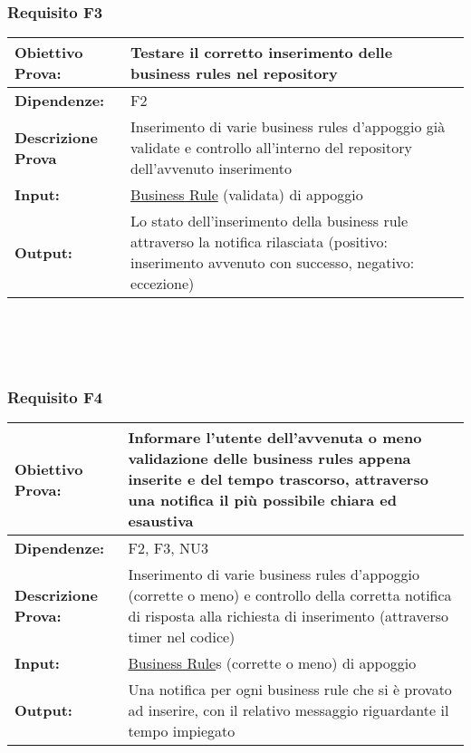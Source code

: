 \subsubsection{Requisito F3}
\begin{tabular}{||p{4cm}||p{8cm}||}
\hline
{\textbf {Obiettivo Prova:}}& Testare il corretto inserimento delle business rules nel repository\\ \hline
{\textbf{Dipendenze:}}& F2 \\ \hline
{\textbf{Descrizione Prova}}&  Inserimento di varie business rules d'appoggio gi\`a validate e controllo all'interno del repository dell'avvenuto inserimento\\ \hline
{\textbf{Input:}}& \underline{Business Rule} (validata) di appoggio \\ \hline
{\textbf{Output:}}& Lo stato dell'inserimento della business rule attraverso la notifica rilasciata (positivo: inserimento avvenuto con successo, negativo: eccezione) \\ \hline
\end{tabular} \\
\\
\\
\subsubsection{Requisito F4}
\begin{tabular}{||p{4cm}||p{8cm}||}
\hline
{\textbf {Obiettivo Prova:}}& Informare l'utente dell'avvenuta o meno validazione delle business rules appena inserite e del tempo trascorso, attraverso una notifica il pi\`u possibile chiara ed esaustiva\\ \hline
{\textbf{Dipendenze:}} & F2, F3, NU3 \\ \hline
{\textbf{Descrizione Prova:}}& Inserimento di varie business rules d'appoggio (corrette o meno) e controllo della corretta notifica di risposta alla richiesta di inserimento (attraverso timer nel codice) \\ \hline
{\textbf{Input:}}& \underline{Business Rule}s (corrette o meno) di appoggio  \\ \hline
{\textbf{Output:}}& Una notifica per ogni business rule che si \`e provato ad inserire, con il relativo messaggio riguardante il tempo impiegato \\ \hline
\end{tabular} \\
\\
\\
